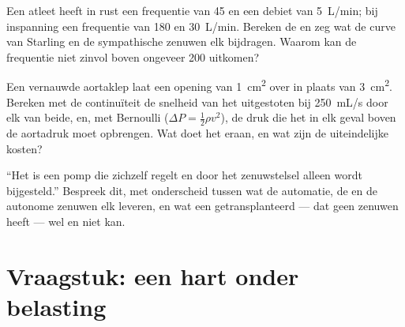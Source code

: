 \begin{exercise}[$\star\star\star$]\label{exo:b2:heart:10}
Een atleet heeft in rust een frequentie van 45 en een debiet van
\qty{5}{L/min}; bij inspanning een frequentie van 180 en \qty{30}{L/min}.
Bereken de  en zeg wat de curve van Starling en de sympathische
zenuwen elk bijdragen. Waarom kan de frequentie niet zinvol boven ongeveer
200 uitkomen?
\end{exercise}

\begin{exercise}[$\star\star\star$]\label{exo:b2:heart:11}
Een vernauwde aortaklep laat een opening van \qty{1}{cm^2} over in plaats van
\qty{3}{cm^2}. Bereken met de continuïteit de snelheid van het uitgestoten
 bij \qty{250}{mL/s} door elk van beide, en, met Bernoulli
($\Delta P = \tfrac12\rho v^2$), de druk die het  in elk geval boven
de aortadruk moet opbrengen. Wat doet het  eraan, en wat zijn de
uiteindelijke kosten?
\end{exercise}

\begin{exercise}[$\star\star\star$]\label{exo:b2:heart:12}
``Het  is een pomp die zichzelf regelt en door het zenuwstelsel alleen
wordt bijgesteld.'' Bespreek dit, met onderscheid tussen wat de automatie,
de  en de autonome zenuwen elk leveren, en wat een
getransplanteerd  --- dat geen zenuwen heeft --- wel en niet kan.
\end{exercise}

\section{Vraagstuk: een hart onder belasting}

